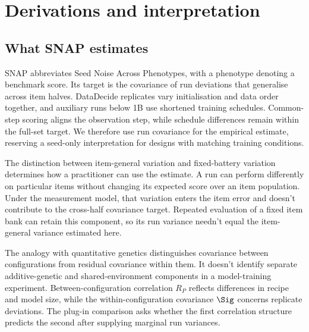 \section{Derivations and interpretation}
\subsection{What SNAP estimates}
SNAP abbreviates Seed Noise Across Phenotypes, with a phenotype denoting a benchmark score. Its target is the covariance of run deviations that generalise across item halves. DataDecide replicates vary initialisation and data order together, and auxiliary runs below 1B use shortened training schedules. Common-step scoring aligns the observation step, while schedule differences remain within the full-set target. We therefore use run covariance for the empirical estimate, reserving a seed-only interpretation for designs with matching training conditions.

The distinction between item-general variation and fixed-battery variation determines how a practitioner can use the estimate. A run can perform differently on particular items without changing its expected score over an item population. Under the measurement model, that variation enters the item error and doesn't contribute to the cross-half covariance target. Repeated evaluation of a fixed item bank can retain this component, so its run variance needn't equal the item-general variance estimated here.

The analogy with quantitative genetics distinguishes covariance between configurations from residual covariance within them. It doesn't identify separate additive-genetic and shared-environment components in a model-training experiment. Between-configuration correlation $R_P$ reflects differences in recipe and model size, while the within-configuration covariance $\Sig$ concerns replicate deviations. The plug-in comparison asks whether the first correlation structure predicts the second after supplying marginal run variances.

